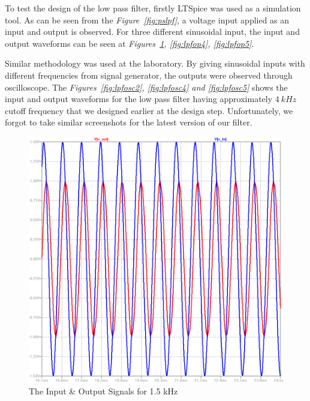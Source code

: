 \documentclass[paper]{IEEEtran}
\begin{document}
	To test the design of the low pass filter, firstly LTSpice was used as a simulation tool. As can be seen from the \textit{Figure~\ref{fig:pslpf}}, a voltage input applied as an input and output is observed. For three different sinusoidal input, the input and output waveforms can be seen at \textit{Figures~\ref{fig:lpfop3}, \ref{fig:lpfop4}, \ref{fig:lpfop5}}. 
	
	Similar methodology was used at the laboratory. By giving sinusoidal inputs with different frequencies from signal generator, the outputs were observed through oscilloscope. The \textit{Figures~\ref{fig:lpfosc2}, \ref{fig:lpfosc4} and \ref{fig:lpfosc5}} shows the input and output waveforms for the low pass filter having approximately $4~kHz$ cutoff frequency that we designed earlier at the design step. Unfortunately, we forgot to take similar screenshots for the latest version of our filter.
	
	
\begin{figure}[H]
	\setlength{\unitlength}{\textwidth}
	\center 
	\includegraphics[width=0.45\unitlength]{lpf_op3.png}
	\caption{\label{fig:lpfop3}The Input \& Output Signals for 1.5 kHz}
\end{figure} 
\end{document}

